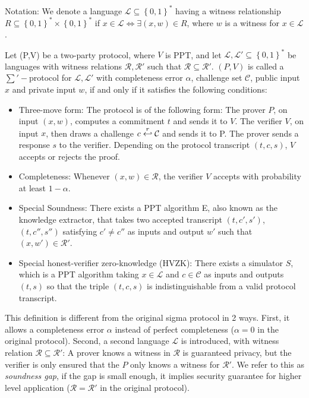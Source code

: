 Notation: We denote a language $\mathcal{L} \subseteq \left\{ 0,1 \right\}^* $
having a witness relationship $R \subseteq \left\{ 0,1 \right\}^* \times \left\{
  0,1 \right\}^*$ if $x \in \mathcal{L} \iff \exists (x,w) \in R$, where
$w$ is a witness for $x \in \mathcal{L}$.

\begin{definition}
  \label{def:zkp-sum-protocol}
  Let (P,V) be a two-party protocol, where $V$ is PPT, and let
  $\mathcal{L},\mathcal{L'} \subseteq \left\{ 0,1 \right\}^*$ be languages with
  witness relations $\mathcal{R},\mathcal{R'}$ such that $\mathcal{R}
  \subseteq \mathcal{R'}$. $(P,V)$ is called a $\sum'-$protocol for
  $\mathcal{L}, \mathcal{L'}$ with completeness error $\alpha$, challenge set
  $\mathcal{C}$, public input $x$ and private input $w$, if and only if it
  satisfies the following conditions:
  \begin{itemize}
  \item Three-move form: The protocol is of the following form: The
    prover $P$, on input $(x,w)$, computes a commitment $t$ and sends it
    to $V$. The verifier $V$, on input $x$, then draws a challenge
    $c \stackrel{r}{\hookleftarrow} \mathcal{C}$ and sends it to P. The prover sends a
    response $s$ to the verifier. Depending on the protocol transcript
    $(t,c,s)$, $V$ accepts or rejects the proof.
  \item Completeness: Whenever $(x,w) \in \mathcal{R}$, the verifier
    $V$ accepts with probability at least $1 - \alpha$.
  \item Special Soundness: There exists a PPT algorithm E, also known as
    the knowledge extractor, that takes two accepted transcript
    $(t,c',s')$,$(t,c'',s'')$ satisfying $c' \neq c''$ as inputs and
    output $w'$ such that $(x,w') \in \mathcal{R'}$.
  \item Special honest-verifier zero-knowledge (HVZK): There exists a
    simulator $S$, which is a PPT
    algorithm taking $x\in \mathcal{L}$ and $c \in \mathcal{C}$ as
    inputs and outputs $(t,s)$ so that the triple $(t,c,s)$ is
    indistinguishable from a valid protocol transcript.
  \end{itemize}
\end{definition}

This definition is different from the original sigma protocol in 2 ways.
First, it allows a completeness error $\alpha$ instead of perfect completeness
($\alpha=0$ in the original protocol).
Second, a second language $\mathcal{L}$ is introduced, with witness relation
$\mathcal{R} \subseteq \mathcal{R'}$: A prover knows a witness in $\mathcal{R}$
is guaranteed privacy, but the verifier is only ensured that the $P$ only knows
a witness for $\mathcal{R'}$. We refer to this as \emph{soundness gap}, if the
gap is small enough, it implies security guarantee for higher level application
($\mathcal{R} = \mathcal{R'}$ in the original protocol).


